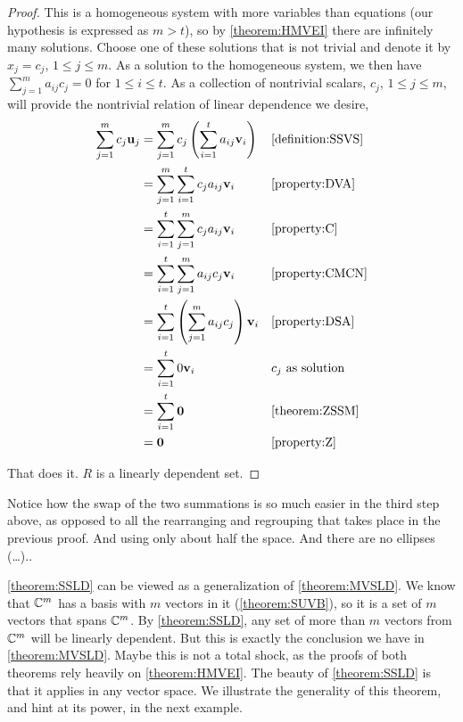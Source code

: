 \documentclass{ximera}
\begin{document}
\begin{theorem}
\begin{proof}
  This is a homogeneous system with more variables than equations (our
  hypothesis is expressed as $m>t$), so by \ref{theorem:HMVEI} there
  are infinitely many solutions.  Choose one of these solutions that
  is not trivial and denote it by $x_j=c_j$, $1\leq j\leq m$.  As a
  solution to the homogeneous system, we then have
  $\sum_{j=1}^{m}a_{ij}c_{j}=0$ for $1\leq i\leq t$.  As a collection
  of nontrivial scalars, $c_j$, $1\leq j\leq m$, will provide the
  nontrivial relation of linear dependence we desire,
  \begin{align*}
    \sum_{j=1}^{m}c_{j}\mathbf{u}_j
    &=\sum_{j=1}^{m}c_{j}\left(\sum_{i=1}^{t}a_{ij}\mathbf{v}_i\right)
    &&\ref{definition:SSVS}\\
    &=\sum_{j=1}^{m}\sum_{i=1}^{t}c_{j}a_{ij}\mathbf{v}_i
    &&\ref{property:DVA}\\
    &=\sum_{i=1}^{t}\sum_{j=1}^{m}c_{j}a_{ij}\mathbf{v}_i
    &&\ref{property:C}\\
    &=\sum_{i=1}^{t}\sum_{j=1}^{m}a_{ij}c_{j}\mathbf{v}_i
    &&\ref{property:CMCN}\\
    &=\sum_{i=1}^{t}\left(\sum_{j=1}^{m}a_{ij}c_{j}\right)\mathbf{v}_i
    &&\ref{property:DSA}\\
    &=\sum_{i=1}^{t}0\mathbf{v}_i
    &&\text{$c_j$ as solution}\\
    &=\sum_{i=1}^{t}\mathbf{0}
    &&\ref{theorem:ZSSM}\\
    &=\mathbf{0}
    &&\ref{property:Z}
  \end{align*}
  
  That does it.  $R$ is a linearly dependent set.

\end{proof}
\end{theorem}

Notice how the swap of the two summations is so much easier in the
third step above, as opposed to all the rearranging and regrouping
that takes place in the previous proof.  And using only about half the
space.  And there are no ellipses (\ldots)..

\ref{theorem:SSLD} can be viewed as a generalization of
\ref{theorem:MVSLD}.  We know that $\mathbb{C}^{m}$ has a basis with $m$
vectors in it (\ref{theorem:SUVB}), so it is a set of $m$ vectors that
spans $\mathbb{C}^{m}$.  By \ref{theorem:SSLD}, any set of more than $m$
vectors from $\mathbb{C}^{m}$ will be linearly dependent.  But this is
exactly the conclusion we have in \ref{theorem:MVSLD}.  Maybe this is
not a total shock, as the proofs of both theorems rely heavily on
\ref{theorem:HMVEI}.  The beauty of \ref{theorem:SSLD} is that it
applies in any vector space.  We illustrate the generality of this
theorem, and hint at its power, in the next example.
\end{document}
